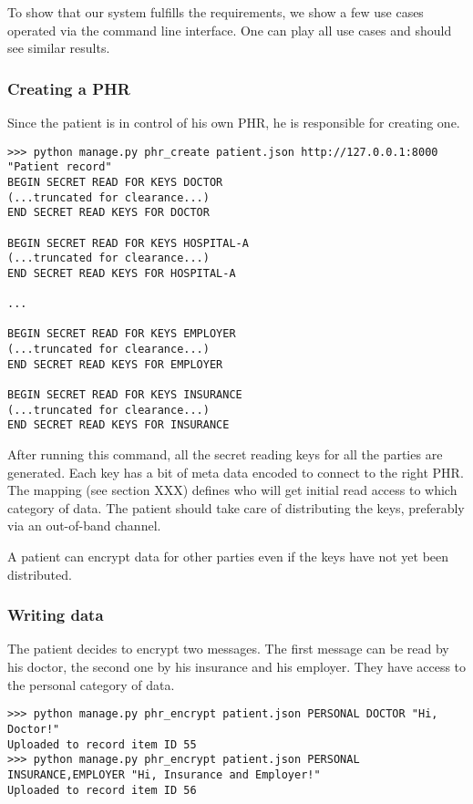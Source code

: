 \documentclass[a4paper]{article}
\begin{document}
		To show that our system fulfills the requirements, we show a few use cases operated via the command line interface. One can play all use cases and should see similar results.
		
		\subsubsection{Creating a PHR}\label{sec:usecase_1}
			Since the patient is in control of his own PHR, he is responsible for creating one.
		
			\begin{lstlisting}
>>> python manage.py phr_create patient.json http://127.0.0.1:8000 "Patient record"
BEGIN SECRET READ FOR KEYS DOCTOR
(...truncated for clearance...)
END SECRET READ KEYS FOR DOCTOR

BEGIN SECRET READ FOR KEYS HOSPITAL-A
(...truncated for clearance...)
END SECRET READ KEYS FOR HOSPITAL-A

...

BEGIN SECRET READ FOR KEYS EMPLOYER
(...truncated for clearance...)
END SECRET READ KEYS FOR EMPLOYER

BEGIN SECRET READ FOR KEYS INSURANCE
(...truncated for clearance...)
END SECRET READ KEYS FOR INSURANCE
			\end{lstlisting}
		
			After running this command, all the secret reading keys for all the parties are generated. Each key has a bit of meta data encoded to connect to the right PHR. The mapping (see section XXX) defines who will get initial read access to which category of data. The patient should take care of distributing the keys, preferably via an out-of-band channel.
		
			A patient can encrypt data for other parties even if the keys have not yet been distributed.
		
		\subsubsection{Writing data}\label{sec:usecase_2}
			The patient decides to encrypt two messages. The first message can be read by his doctor, the second one by his insurance and his employer. They have access to the personal category of data.
		
			\begin{lstlisting}
>>> python manage.py phr_encrypt patient.json PERSONAL DOCTOR "Hi, Doctor!"
Uploaded to record item ID 55
>>> python manage.py phr_encrypt patient.json PERSONAL INSURANCE,EMPLOYER "Hi, Insurance and Employer!"
Uploaded to record item ID 56
			\end{lstlisting}
		
\end{document}
